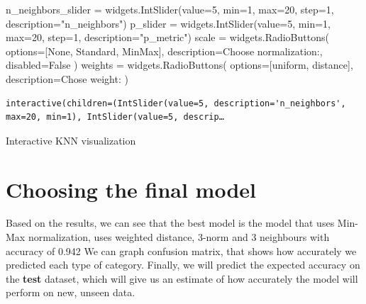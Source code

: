 \documentclass[
  letterpaper,
  DIV=11,
  numbers=noendperiod]{scrartcl}
\newenvironment{Shaded}{\begin{snugshade}}{\end{snugshade}}
\newcommand{\BuiltInTok}[1]{\textcolor[rgb]{0.00,0.23,0.31}{#1}}
\newcommand{\DecValTok}[1]{\textcolor[rgb]{0.68,0.00,0.00}{#1}}
\newcommand{\NormalTok}[1]{\textcolor[rgb]{0.00,0.23,0.31}{#1}}
\newcommand{\OperatorTok}[1]{\textcolor[rgb]{0.37,0.37,0.37}{#1}}
\newcommand{\StringTok}[1]{\textcolor[rgb]{0.13,0.47,0.30}{#1}}
\newcommand{\VariableTok}[1]{\textcolor[rgb]{0.07,0.07,0.07}{#1}}
\begin{document}
\begin{Shaded}
\begin{Highlighting}[]
\NormalTok{n\_neighbors\_slider }\OperatorTok{=}\NormalTok{ widgets.IntSlider(value}\OperatorTok{=}\DecValTok{5}\NormalTok{, }\BuiltInTok{min}\OperatorTok{=}\DecValTok{1}\NormalTok{, }\BuiltInTok{max}\OperatorTok{=}\DecValTok{20}\NormalTok{, step}\OperatorTok{=}\DecValTok{1}\NormalTok{, description}\OperatorTok{=}\StringTok{"n\_neighbors"}\NormalTok{)}
\NormalTok{p\_slider }\OperatorTok{=}\NormalTok{ widgets.IntSlider(value}\OperatorTok{=}\DecValTok{5}\NormalTok{, }\BuiltInTok{min}\OperatorTok{=}\DecValTok{1}\NormalTok{, }\BuiltInTok{max}\OperatorTok{=}\DecValTok{20}\NormalTok{, step}\OperatorTok{=}\DecValTok{1}\NormalTok{, description}\OperatorTok{=}\StringTok{"p\_metric"}\NormalTok{)}
\NormalTok{scale }\OperatorTok{=}\NormalTok{ widgets.RadioButtons(}
\NormalTok{    options}\OperatorTok{=}\NormalTok{[}\StringTok{\textquotesingle{}None\textquotesingle{}}\NormalTok{, }\StringTok{\textquotesingle{}Standard\textquotesingle{}}\NormalTok{, }\StringTok{\textquotesingle{}MinMax\textquotesingle{}}\NormalTok{],}
\NormalTok{    description}\OperatorTok{=}\StringTok{\textquotesingle{}Choose normalization:\textquotesingle{}}\NormalTok{,}
\NormalTok{    disabled}\OperatorTok{=}\VariableTok{False}
\NormalTok{)}
\NormalTok{weights }\OperatorTok{=}\NormalTok{ widgets.RadioButtons(}
\NormalTok{    options}\OperatorTok{=}\NormalTok{[}\StringTok{\textquotesingle{}uniform\textquotesingle{}}\NormalTok{, }\StringTok{\textquotesingle{}distance\textquotesingle{}}\NormalTok{],}
\NormalTok{    description}\OperatorTok{=}\StringTok{\textquotesingle{}Chose weight:\textquotesingle{}}
\NormalTok{)}
\end{Highlighting}
\end{Shaded}

\label{dynamic_graph}
\begin{verbatim}
interactive(children=(IntSlider(value=5, description='n_neighbors', max=20, min=1), IntSlider(value=5, descrip…
\end{verbatim}

Interactive KNN visualization

\section{Choosing the final model}\label{choosing-the-final-model}

Based on the results, we can see that the best model is the model that
uses Min-Max normalization, uses weighted distance, 3-norm and 3
neighbours with accuracy of 0.942 We can graph confusion matrix, that
shows how accurately we predicted each type of category. Finally, we
will predict the expected accuracy on the \textbf{test} dataset, which
will give us an estimate of how accurately the model will perform on
new, unseen data.
\end{document}
